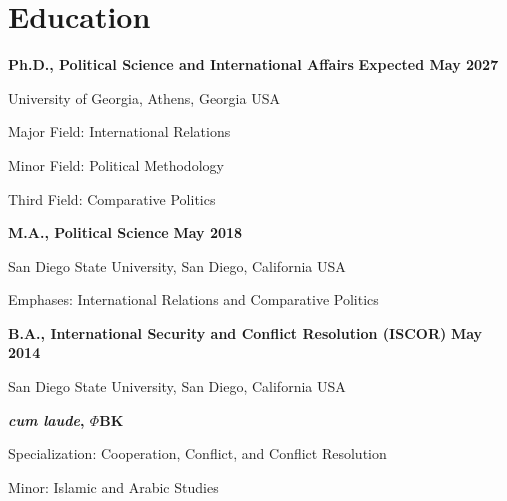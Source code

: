 \documentclass[letterpaper,12pt]{article}
\newenvironment{list1}{
  \begin{list}{}{
      \setlength{\itemsep}{0in}
      \setlength{\parsep}{0in} \setlength{\parskip}{0in}
      \setlength{\topsep}{0in} \setlength{\partopsep}{0in} 
      \setlength{\leftmargin}{0in}}}{\end{list}}
\newenvironment{list2}{
  \begin{list}{$\bullet$}{%
      \setlength{\itemsep}{0in}
      \setlength{\parsep}{0in} \setlength{\parskip}{0in}
      \setlength{\topsep}{0in} \setlength{\partopsep}{0in} 
      \setlength{\leftmargin}{0.5in}}}{\end{list}}
\begin{document}
\section{Education}
{\bf Ph.D., Political Science and International Affairs} \hfill {\bf Expected May 2027}
\begin{list1} 
\item University of Georgia, Athens, Georgia USA
\item Major Field: International Relations
\item Minor Field: Political Methodology
\item Third Field: Comparative Politics
\end{list1}
\par
{\bf M.A., Political Science} \hfill {\bf May 2018}
\begin{list1} 
\item San Diego State University, San Diego, California USA
\item Emphases: International Relations and Comparative Politics
\end{list1}
\par
{\bf B.A., International Security and Conflict Resolution (ISCOR)} \hfill {\bf May 2014}
\begin{list1} 
\item San Diego State University, San Diego, California USA
\item \textbf{\textit{cum laude}, $\Phi$BK}
\item Specialization: Cooperation, Conflict, and Conflict Resolution
\item Minor: Islamic and Arabic Studies
\end{list1}

\end{document}
